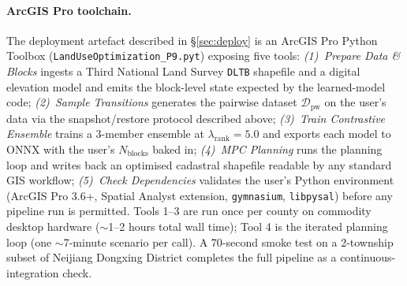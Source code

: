 \documentclass[11pt]{article}
\begin{document}
\paragraph{ArcGIS Pro toolchain.}\label{sec:methods-toolchain}

The deployment artefact described in \S\ref{sec:deploy} is an ArcGIS Pro Python Toolbox (\texttt{LandUseOptimization\_P9.pyt}) exposing five tools: \emph{(1)~Prepare Data \& Blocks} ingests a Third National Land Survey \texttt{DLTB} shapefile and a digital elevation model and emits the block-level state expected by the learned-model code; \emph{(2)~Sample Transitions} generates the pairwise dataset $\mathcal{D}_{\text{pw}}$ on the user's data via the snapshot/restore protocol described above; \emph{(3)~Train Contrastive Ensemble} trains a 3-member ensemble at $\lambda_{\text{rank}}{=}5.0$ and exports each model to ONNX with the user's $N_{\text{blocks}}$ baked in; \emph{(4)~MPC Planning} runs the planning loop and writes back an optimised cadastral shapefile readable by any standard GIS workflow; \emph{(5)~Check Dependencies} validates the user's Python environment (ArcGIS Pro 3.6+, Spatial Analyst extension, \texttt{gymnasium}, \texttt{libpysal}) before any pipeline run is permitted. Tools 1--3 are run once per county on commodity desktop hardware ($\sim$1--2 hours total wall time); Tool 4 is the iterated planning loop (one $\sim$7-minute scenario per call). A 70-second smoke test on a 2-township subset of Neijiang Dongxing District completes the full pipeline as a continuous-integration check.
\end{document}
